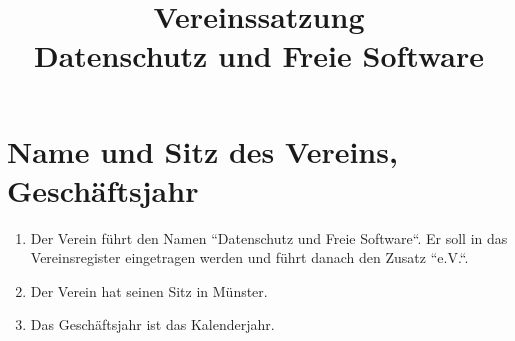 

\title{Vereinssatzung\\Datenschutz und Freie Software}


\maketitle

\section{Name und Sitz des Vereins, Geschäftsjahr}
\begin{enumerate}[label=(\arabic*)]
    \item Der Verein führt den Namen ``Datenschutz und Freie Software``. Er soll
        in das Vereinsregister eingetragen werden und führt danach den Zusatz
        ``e.V.``.
    \item Der Verein hat seinen Sitz in Münster.
    \item Das Geschäftsjahr ist das Kalenderjahr.
\end{enumerate}

